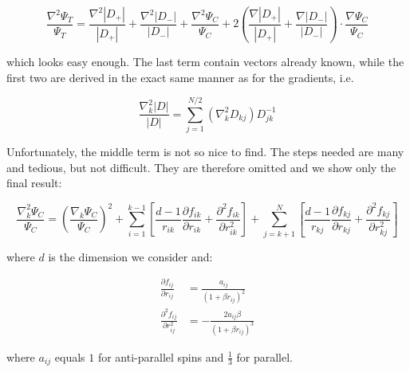 \documentclass[english, a4paper]{article}
\begin{document}
	\begin{equation}
	\frac{\nabla^2\Psi_T}{\Psi_T} = \frac{\nabla^2 |D_+|}{|D_+|} + \frac{\nabla^2 |D_-|}{|D_-|} + \frac{\nabla^2 \Psi_C}{\Psi_C} + 2\left( \frac{\nabla |D_+|}{|D_+|} + \frac{\nabla |D_-|}{|D_-|} \right)\cdot\frac{\nabla \Psi_C}{\Psi_C}
	\end{equation}
	
	which looks easy enough. The last term contain vectors already known, while the first two are derived in the exact same manner as for the gradients, i.e.
	
	\begin{equation}
	\frac{\nabla_k^2|D|}{|D|} = \sum_{j=1}^{N/2}(\nabla_k^2D_{kj})D_{jk}^{-1}
	\end{equation}
	
	Unfortunately, the middle term is not so nice to find. The steps needed are many and tedious, but not difficult. They are therefore omitted and we show only the final result:
	
	\begin{equation}
	\frac{\nabla_k^2 \Psi_C}{\Psi_C} = \left(\frac{\nabla_k\Psi_C}{\Psi_C}\right)^2 + \sum_{i=1}^{k-1}\left[\frac{d-1}{r_{ik}}\frac{\partial f_{ik}}{\partial r_{ik}} + \frac{\partial^2 f_{ik}}{\partial r_{ik}^2}\right] + \sum_{j=k+1}^{N}\left[\frac{d-1}{r_{kj}}\frac{\partial f_{kj}}{\partial r_{kj}} + \frac{\partial^2 f_{kj}}{\partial r_{kj}^2}\right]
	\end{equation}
	
	where $d$ is the dimension we consider and:
	
	\begin{align}
	\frac{\partial f_{ij}}{\partial r_{ij}} &= \frac{a_{ij}}{(1+\beta r_{ij})^2}\\
	\frac{\partial^2 f_{ij}}{\partial r_{ij}^2} &= -\frac{2a_{ij}\beta}{(1+\beta r_{ij})^3}
	\end{align}
	
	where $a_{ij}$ equals $1$ for anti-parallel spins and $\frac{1}{3}$ for parallel.
	
	
\end{document}
